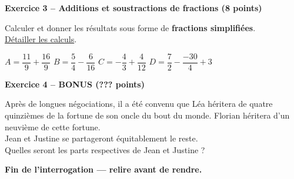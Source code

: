 \documentclass[12pt,a4paper]{exam}
\begin{document}
\noindent\hrulefill
\vspace{0.5cm}


\textbf{Exercice 3 – Additions et soustractions de fractions (8 points)}
\vspace{5pt}

Calculer et donner les résultats sous forme de \textbf{fractions simplifiées}.
\\\underline{Détailler les calculs}.

\vspace{5pt}

\begin{questions}
    \question $A = \dfrac{11}{9} + \dfrac{16}{9}$
    \vspace{5pt}
    \question $B = \dfrac{5}{4} - \dfrac{6}{16}$
    \vspace{5pt}
    \question $C = -\dfrac{4}{3} + \dfrac{4}{12}$
    \vspace{5pt}
    \question $D = \dfrac{7}{2} - \dfrac{-30}{4} + 3$
\end{questions}

\vspace{10pt}

\noindent\hrulefill
\vspace{0.5cm}


\textbf{Exercice 4 – BONUS (??? points)}
\vspace{5pt}

Après de longues négociations, il a été convenu que Léa héritera de quatre quinzièmes de la 
fortune de son oncle du bout du monde. Florian héritera d'un neuvième de cette fortune.
\\Jean et Justine se partageront équitablement le reste.
\vspace{10pt}
\\
Quelles seront les parts respectives de Jean et Justine ?
\vspace{10pt}

\noindent\hrulefill
\vspace{0.5cm}


\begin{center}
\textbf{Fin de l'interrogation — relire avant de rendre.}    
\end{center}
\end{document}
